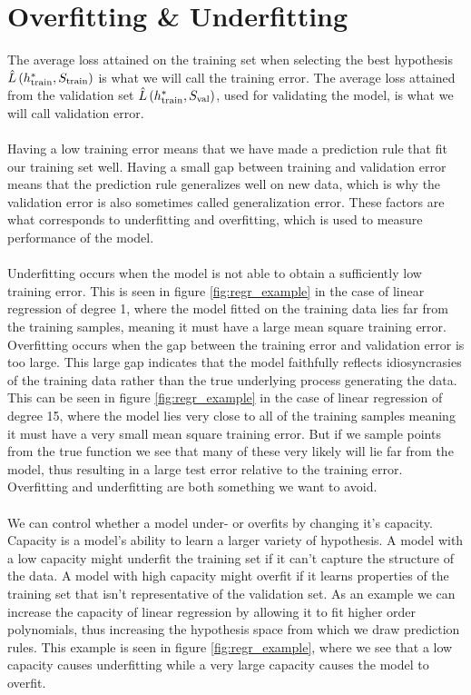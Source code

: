 \section{Overfitting \& Underfitting}
The average loss attained on the training set when selecting the best hypothesis $\hat{L}\left (h^*_\text{train}, S_\text{train}\right)$ is what we will call the training error. The average loss attained from the validation set $\hat{L}\left (h^*_\text{train}, S_\text{val}\right)$, used for validating the model, is what we will call validation error.\\
\\
Having a low training error means that we have made a prediction rule that fit our training set well. Having a small gap between training and validation error means that the prediction rule generalizes well on new data, which is why the validation error is also sometimes called generalization error. These factors are what corresponds to underfitting and overfitting, which is used to measure performance of the model.\\
\\
Underfitting occurs when the model is not able to obtain a sufficiently low training error. This is seen in figure \ref{fig:regr_example} in the case of linear regression of degree 1, where the model fitted on the training data lies far from the training samples, meaning it must have a large mean square training error. Overfitting occurs when the gap between the training error and validation error is too large. This large gap indicates that the model faithfully reflects idiosyncrasies of the training data rather than the true underlying process generating the data. This can be seen in figure \ref{fig:regr_example} in the case of linear regression of degree 15, where the model lies very close to all of the training samples meaning it must have a very small mean square training error. But if we sample points from the true function we see that many of these very likely will lie far from the model, thus resulting in a large test error relative to the training error. Overfitting and underfitting are both something we want to avoid. \\
\\
We can control whether a model under- or overfits by changing it's capacity. Capacity is a model's ability to learn a larger variety of hypothesis. A model with a low capacity might underfit the training set if it can't capture the structure of the data. A model with high capacity might overfit if it learns properties of the training set that isn't representative of the validation set. As an example we can increase the capacity of linear regression by allowing it to fit higher order polynomials, thus increasing the hypothesis space from which we draw prediction rules. This example is seen in figure \ref{fig:regr_example}, where we see that a low capacity causes underfitting while a very large capacity causes the model to overfit.


